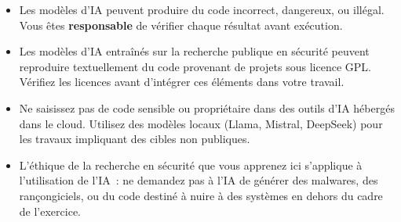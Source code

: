 \begin{itemize}
  \item Les modèles d'IA peuvent produire du code incorrect,
        dangereux, ou illégal. Vous êtes \textbf{responsable} de
        vérifier chaque résultat avant exécution.
  \item Les modèles d'IA entraînés sur la recherche publique en
        sécurité peuvent reproduire textuellement du code provenant
        de projets sous licence GPL. Vérifiez les licences avant
        d'intégrer ces éléments dans votre travail.
  \item Ne saisissez pas de code sensible ou propriétaire dans des
        outils d'IA hébergés dans le cloud. Utilisez des modèles
        locaux (Llama, Mistral, DeepSeek) pour les travaux impliquant
        des cibles non publiques.
  \item L'éthique de la recherche en sécurité que vous apprenez ici
        s'applique à l'utilisation de l'IA~: ne demandez pas à l'IA
        de générer des malwares, des rançongiciels, ou du code destiné
        à nuire à des systèmes en dehors du cadre de l'exercice.
\end{itemize}

